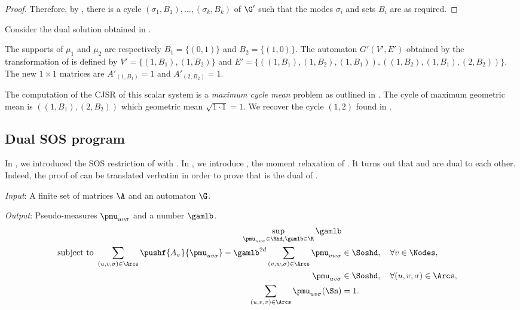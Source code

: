 \documentclass[11pt,twoside,a4paper,openright]{uclouvain-thesis}
\begin{document}
\begin{myprop}
\begin{proof}
    Therefore, by ,
    there is a cycle $(\sigma_1, B_1), \ldots, (\sigma_k, B_k)$ of $\G'$ such that the modes $\sigma_i$ and sets $B_i$ are as required.
  \end{proof}
\end{myprop}

\begin{myexem}
  \label{exem:simple05}
  Consider the dual solution obtained in .

  The supports of $\mu_1$ and $\mu_2$ are respectively $B_1 = \{(0, 1)\}$ and $B_2 = \{(1, 0)\}$.
  The automaton $G'(V', E')$ obtained by the transformation of  is defined by
  $V' = \{(1, B_1), (1, B_2)\}$ and $E' = \{((1, B_1), (1, B_2), (1, B_1)), ((1, B_2), (1, B_1), (2, B_2))\}$.
  The new $1 \times 1$ matrices are $A'_{(1, B_1)} = 1$ and $A'_{(2, B_2)} = 1$.

  The computation of the CJSR of this scalar system is a \emph{maximum cycle mean} problem
  as outlined in \cite{ahmadi2012joint}.
  The cycle of maximum geometric mean is $((1, B_1), (2, B_2))$ which geometric mean $\sqrt{1 \cdot 1} = 1$.
  We recover the cycle $(1, 2)$ found in .
\end{myexem}

\subsection{Dual SOS program}
\label{sec:dual}
In , we introduced the SOS restriction of  with .
In , we introduce , the moment relaxation of .
It turns out that  and  are dual to each other.
Indeed, the proof of  can be translated verbatim in order to prove that  is the dual of .

\begin{myprog}
  \label{prog:dual}

  \emph{Input}: A finite set of matrices $\A$ and an automaton $\G$.

  \emph{Output}: Pseudo-measures $\pmu_{uv\sigma}$ and a number $\gamlb$.
  \begin{align}
    \notag
    \sup_{\pmu_{uv\sigma} \in \Rhd, \gamlb \in \R} \gamlb\\
    \label{eq:dual1}
    \text{subject to }\sum_{(u,v,\sigma) \in \Arcs} \pushf{A_\sigma}{\pmu_{uv\sigma}} - \gamlb^{2d} \sum_{(v,w,\sigma) \in \Arcs} \pmu_{vw\sigma} & \in \Soshd, \quad \forall v \in \Nodes,\\
    \label{eq:dual2}
    \pmu_{uv\sigma} & \in \Soshd, \quad \forall (u,v,\sigma) \in \Arcs,\\
    \label{eq:dual3}
    \sum_{(u,v,\sigma) \in \Arcs} \pmu_{uv\sigma}(\Sn) & = 1.
  \end{align}
\end{myprog}
\end{document}
